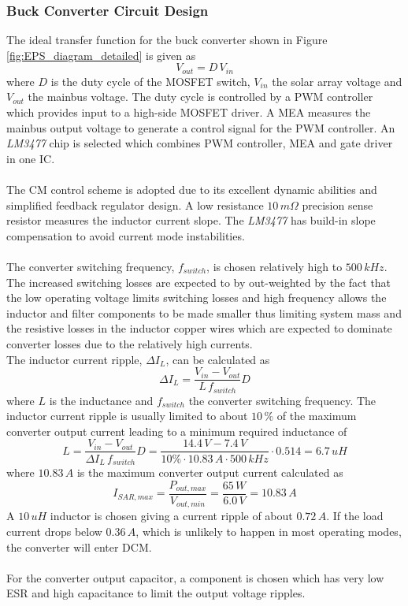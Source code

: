 \subsubsection{Buck Converter Circuit Design}
The ideal transfer function for the buck converter shown in Figure \ref{fig:EPS_diagram_detailed} is given as
%
\begin{equation}
V_{out}=D\,V_{in}
\end{equation}
%
where $D$ is the duty cycle of the MOSFET switch, $V_{in}$ the solar array voltage and $V_{out}$ the mainbus voltage. The duty cycle is controlled by a \ac{PWM} controller which provides input to a high-side MOSFET driver. A \ac{MEA} measures the mainbus output voltage to generate a control signal for the PWM controller. An \textit{LM3477} chip is selected which combines \ac{PWM} controller, \ac{MEA} and gate driver in one \ac{IC}.
\\
\\
The \ac{CM} control scheme is adopted due to its excellent dynamic abilities\cite[sec. 12-3-6]{Fundamentals} and simplified feedback regulator design. A low resistance $10\,m \Omega$ precision sense resistor measures the inductor current slope. The \textit{LM3477} has build-in slope compensation to avoid current mode instabilities\cite[sec. 12-1]{Fundamentals}.
\\
\\
The converter switching frequency, $f_{switch}$, is chosen relatively high to $500\,kHz$. The increased switching losses are expected to by out-weighted by the fact that the low operating voltage limits switching losses and high frequency allows the inductor and filter components to be made smaller thus limiting system mass and the resistive losses in the inductor copper wires which are expected to dominate converter losses due to the relatively high currents.
\\
%
\noindent
The inductor current ripple, $\Delta I_L$, can be calculated as 
%
\begin{equation}
\Delta I_L=\dfrac{V_{in}-V_{out}}{L\,f_{switch}}D
\end{equation}
%
where $L$ is the inductance and $f_{switch}$ the converter switching frequency. 
The inductor current ripple is usually limited to about $10\,\%$ of the maximum converter output current leading to a minimum required inductance of
%
\begin{equation}
L=\dfrac{V_{in}-V_{out}}{\Delta I_L\,f_{switch}}D=\dfrac{14.4\,V-7.4\,V}{10\% \cdot 10.83\,A\cdot 500\,kHz}\cdot 0.514=6.7\,uH
\end{equation}
%
where $10.83\,A$ is the maximum converter output current calculated as 
%
\begin{equation}
I_{SAR,max}=\dfrac{P_{out,max}}{V_{out,min}}=\dfrac{65\,W}{6.0\,V}=10.83\,A
\end{equation}
%
A $10\,uH$ inductor is chosen giving a current ripple of about $0.72\,A$. If the load current drops below $0.36\,A$, which is unlikely to happen in most operating modes, the converter will enter \ac{DCM}.
\\
\\
For the converter output capacitor, a component is chosen which has very low \ac{ESR} and high capacitance to limit the output voltage ripples.
%
